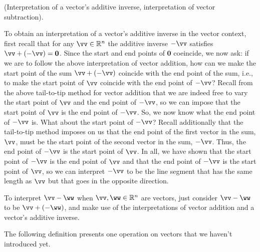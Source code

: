 \begin{deriv}
    (Interpretation of a vector's additive inverse, interpretation of vector subtraction).
    
    To obtain an interpretation of a vector's additive inverse in the vector context, first recall that for any $\vv \in \R^n$ the additive inverse $-\vv$ satisfies $\vv + (-\vv) = \mathbf{0}$. Since the start and end points of $\mathbf{0}$ coeincide, we now ask: if we are to follow the above interpretation of vector addition, how can we make the start point of the sum $\vv + (-\vv)$ coincide with the end point of the sum, i.e., to make the start point of $\vv$ coincide with the end point of $-\vv$? Recall from the above tail-to-tip method for vector addition that we are indeed free to vary the start point of $\vv$ and the end point of $-\vv$, so we can impose that the start point of $\vv$ is the end point of $-\vv$. So, we now know what the end point of $-\vv$ is. What about the start point of $-\vv$? Recall additionally that the tail-to-tip method imposes on us that the end point of the first vector in the sum, $\vv$, must be the start point of the second vector in the sum, $-\vv$. Thus, the end point of $-\vv$ is the start point of $\vv$. In all, we have shown that the start point of $-\vv$ is the end point of $\vv$ and that the end point of $-\vv$ is the start point of $\vv$, so we can interpret $-\vv$ to be the line segment that has the same length as $\vv$ but that goes in the opposite direction.
    
    To interpret $\vv - \ww$ when $\vv, \ww \in \R^n$ are vectors, just consider $\vv - \ww$ to be $\vv + (-\ww)$, and make use of the interpretations of vector addition and a vector's additive inverse.
\end{deriv}

The following definition presents one operation on vectors that we haven't introduced yet.

